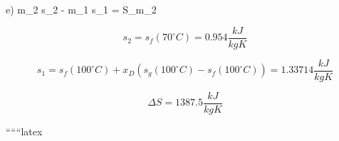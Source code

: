 e) \quad m_2 s_2 - m_1 s_1 = \Delta S_{m_2}

\[
s_2 = s_f (70^\circ C) = 0.954 \frac{kJ}{kgK}
\]

\[
s_1 = s_f (100^\circ C) + x_D (s_g (100^\circ C) - s_f (100^\circ C)) = 1.33714 \frac{kJ}{kgK}
\]

\[
\Delta S = 1387.5 \frac{kJ}{kgK}
\]

``````latex